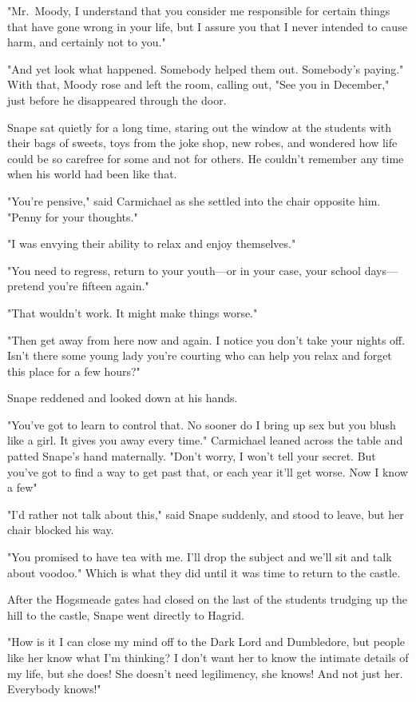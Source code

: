 "Mr.~Moody, I understand that you consider me responsible for certain things that have gone wrong in your life, but I assure you that I never intended to cause harm, and certainly not to you."

"And yet look what happened. Somebody helped them out. Somebody's paying." With that, Moody rose and left the room, calling out, "See you in December," just before he disappeared through the door.

Snape sat quietly for a long time, staring out the window at the students with their bags of sweets, toys from the joke shop, new robes, and wondered how life could be so carefree for some and not for others. He couldn't remember any time when his world had been like that.

"You're pensive," said Carmichael as she settled into the chair opposite him. "Penny for your thoughts."

"I was envying their ability to relax and enjoy themselves."

"You need to regress, return to your youth—or in your case, your school days—pretend you're fifteen again."

"That wouldn't work. It might make things worse."

"Then get away from here now and again. I notice you don't take your nights off. Isn't there some young lady you're courting who can help you relax and forget this place for a few hours?"

Snape reddened and looked down at his hands.

"You've got to learn to control that. No sooner do I bring up sex but you blush like a girl. It gives you away every time." Carmichael leaned across the table and patted Snape's hand maternally. "Don't worry, I won't tell your secret. But you've got to find a way to get past that, or each year it'll get worse. Now I know a few{\el}"

"I'd rather not talk about this," said Snape suddenly, and stood to leave, but her chair blocked his way.

"You promised to have tea with me. I'll drop the subject and we'll sit and talk about voodoo." Which is what they did until it was time to return to the castle.

After the Hogsmeade gates had closed on the last of the students trudging up the hill to the castle, Snape went directly to Hagrid.

"How is it I can close my mind off to the Dark Lord and Dumbledore, but people like her know what I'm thinking? I don't want her to know the intimate details of my life, but she does! She doesn't need legilimency, she knows! And not just her. Everybody knows!"

